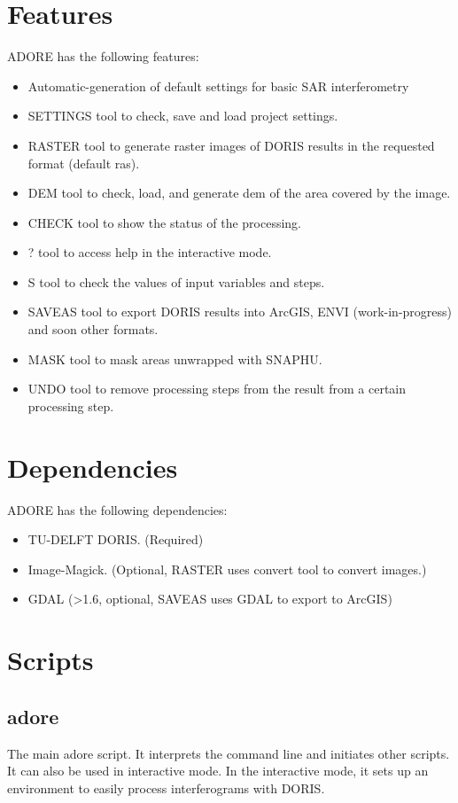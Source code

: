 \documentclass[letterpaper,10pt]{article}
\begin{document}
\section{Features}
ADORE has the following features:
\begin{itemize}
 \item Automatic-generation of default settings for basic SAR interferometry
 \item SETTINGS tool to check, save and load project settings.
 \item RASTER tool to generate raster images of DORIS results in the requested format (default ras).
 \item DEM tool to check, load, and generate dem of the area covered by the image.
 \item CHECK tool to show the status of the processing. 
 \item ? tool to access help in the interactive mode.
 \item S tool to check the values of input variables and steps. 
 \item SAVEAS tool to export DORIS results into ArcGIS, ENVI (work-in-progress) and soon other formats.
 \item MASK tool to mask areas unwrapped with SNAPHU.
 \item UNDO tool to remove processing steps from the result from a certain processing step. 
\end{itemize}

\section{Dependencies}
ADORE has the following dependencies:
\begin{itemize}
 \item TU-DELFT DORIS. (Required)
 \item Image-Magick. (Optional, RASTER uses convert tool to convert images.)
 \item GDAL (>1.6, optional, SAVEAS uses GDAL to export to ArcGIS) 
\end{itemize}



\section{Scripts}
\subsection{adore}
The main adore script. It interprets the command line and initiates other scripts. It can also be used in interactive mode. In the interactive mode, it sets up an environment to easily process interferograms with DORIS. 
\end{document}
